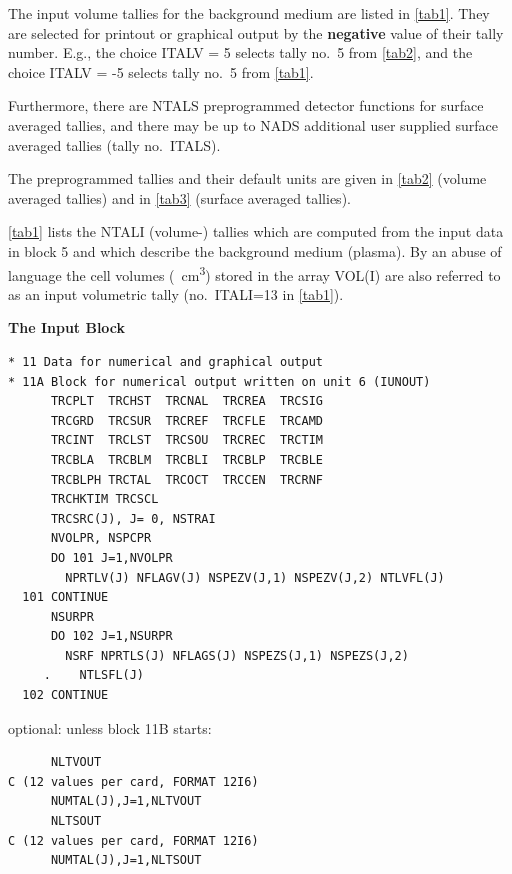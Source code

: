 The input volume tallies for the background medium are listed in \cref{tab1}.
They are selected for printout or graphical output by the \textbf{negative}
value of their tally number.
E.g., the choice ITALV = 5 selects tally no.\ 5 from \cref{tab2}, and the
choice ITALV = -5 selects tally no.\ 5 from \cref{tab1}.

Furthermore, there are NTALS  preprogrammed detector functions for surface
averaged tallies, and there may be up to NADS additional user supplied surface
averaged tallies (tally no.\ ITALS).

The preprogrammed tallies and their default units are given in \cref{tab2}
(volume averaged tallies) and in \cref{tab3} (surface averaged tallies).

\cref{tab1} lists the NTALI  (volume-) tallies which are
computed from the input data in block 5 and which describe the
background medium (plasma).
By an abuse of language the cell volumes (\si{\per\cubic\centi\metre}) stored
in the array VOL(I) are also referred to as an input volumetric tally (no.\
ITALI=13 in \cref{tab1}).

\medskip

\textbf{The Input Block}

\medskip

\begin{lstlisting}
* 11 Data for numerical and graphical output
* 11A Block for numerical output written on unit 6 (IUNOUT)
      TRCPLT  TRCHST  TRCNAL  TRCREA  TRCSIG
      TRCGRD  TRCSUR  TRCREF  TRCFLE  TRCAMD
      TRCINT  TRCLST  TRCSOU  TRCREC  TRCTIM
      TRCBLA  TRCBLM  TRCBLI  TRCBLP  TRCBLE
      TRCBLPH TRCTAL  TRCOCT  TRCCEN  TRCRNF
      TRCHKTIM TRCSCL
      TRCSRC(J), J= 0, NSTRAI
      NVOLPR, NSPCPR
      DO 101 J=1,NVOLPR
        NPRTLV(J) NFLAGV(J) NSPEZV(J,1) NSPEZV(J,2) NTLVFL(J)
  101 CONTINUE
      NSURPR
      DO 102 J=1,NSURPR
        NSRF NPRTLS(J) NFLAGS(J) NSPEZS(J,1) NSPEZS(J,2)
     .    NTLSFL(J)
  102 CONTINUE
\end{lstlisting}

optional: unless block 11B starts:

\begin{lstlisting}
      NLTVOUT
C (12 values per card, FORMAT 12I6)
      NUMTAL(J),J=1,NLTVOUT
      NLTSOUT
C (12 values per card, FORMAT 12I6)
      NUMTAL(J),J=1,NLTSOUT
\end{lstlisting}

